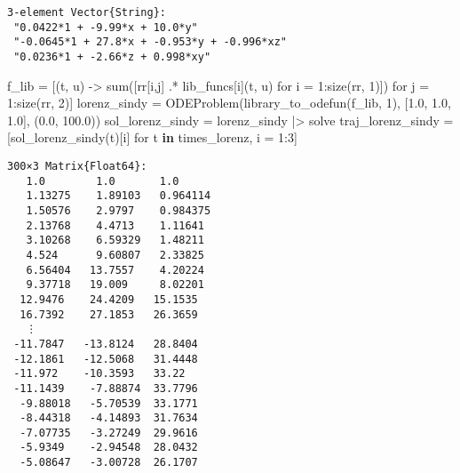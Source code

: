 \documentclass[
]{article}
\newenvironment{Shaded}{\begin{snugshade}}{\end{snugshade}}
\newcommand{\FloatTok}[1]{\textcolor[rgb]{0.68,0.00,0.00}{#1}}
\newcommand{\FunctionTok}[1]{\textcolor[rgb]{0.28,0.35,0.67}{#1}}
\newcommand{\KeywordTok}[1]{\textcolor[rgb]{0.00,0.23,0.31}{\textbf{#1}}}
\newcommand{\NormalTok}[1]{\textcolor[rgb]{0.00,0.23,0.31}{#1}}
\newcommand{\OperatorTok}[1]{\textcolor[rgb]{0.37,0.37,0.37}{#1}}
\begin{document}
\begin{verbatim}
3-element Vector{String}:
 "0.0422*1 + -9.99*x + 10.0*y"
 "-0.0645*1 + 27.8*x + -0.953*y + -0.996*xz"
 "0.0236*1 + -2.66*z + 0.998*xy"
\end{verbatim}

\begin{Shaded}
\begin{Highlighting}[]
\NormalTok{f\_lib }\OperatorTok{=}\NormalTok{ [(t, u) }\OperatorTok{{-}\textgreater{}} \FunctionTok{sum}\NormalTok{([rr[i,j] }\OperatorTok{.*}\NormalTok{ lib\_funcs[i](t, u) for i }\OperatorTok{=} \FloatTok{1}\OperatorTok{:}\FunctionTok{size}\NormalTok{(rr, }\FloatTok{1}\NormalTok{)]) for j }\OperatorTok{=} \FloatTok{1}\OperatorTok{:}\FunctionTok{size}\NormalTok{(rr, }\FloatTok{2}\NormalTok{)]}
\NormalTok{lorenz\_sindy }\OperatorTok{=} \FunctionTok{ODEProblem}\NormalTok{(}\FunctionTok{library\_to\_odefun}\NormalTok{(f\_lib, }\FloatTok{1}\NormalTok{), [}\FloatTok{1.0}\NormalTok{, }\FloatTok{1.0}\NormalTok{, }\FloatTok{1.0}\NormalTok{], (}\FloatTok{0.0}\NormalTok{, }\FloatTok{100.0}\NormalTok{)) }
\NormalTok{sol\_lorenz\_sindy }\OperatorTok{=}\NormalTok{ lorenz\_sindy }\OperatorTok{|\textgreater{}}\NormalTok{ solve}
\NormalTok{traj\_lorenz\_sindy }\OperatorTok{=}\NormalTok{ [}\FunctionTok{sol\_lorenz\_sindy}\NormalTok{(t)[i] for t }\KeywordTok{in}\NormalTok{ times\_lorenz, i }\OperatorTok{=} \FloatTok{1}\OperatorTok{:}\FloatTok{3}\NormalTok{]}
\end{Highlighting}
\end{Shaded}

\begin{verbatim}
300×3 Matrix{Float64}:
   1.0        1.0       1.0
   1.13275    1.89103   0.964114
   1.50576    2.9797    0.984375
   2.13768    4.4713    1.11641
   3.10268    6.59329   1.48211
   4.524      9.60807   2.33825
   6.56404   13.7557    4.20224
   9.37718   19.009     8.02201
  12.9476    24.4209   15.1535
  16.7392    27.1853   26.3659
   ⋮                   
 -11.7847   -13.8124   28.8404
 -12.1861   -12.5068   31.4448
 -11.972    -10.3593   33.22
 -11.1439    -7.88874  33.7796
  -9.88018   -5.70539  33.1771
  -8.44318   -4.14893  31.7634
  -7.07735   -3.27249  29.9616
  -5.9349    -2.94548  28.0432
  -5.08647   -3.00728  26.1707
\end{verbatim}
\end{document}
